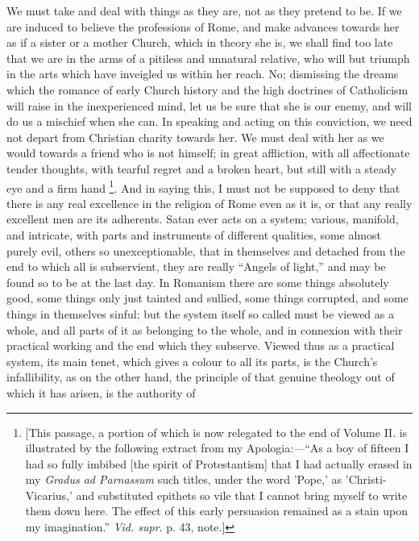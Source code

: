 We must take and deal with things as they are, not as they pretend
to be. If we are induced to believe the professions of Rome, and make
advances towards her as if a sister or a mother Church, which in
theory she is, we shall find too late that we are in the arms of a
pitiless and unnatural relative, who will but triumph in the arts
which have inveigled us within her reach. No; dismissing the dreams
which the romance of early Church history and the high doctrines
of Catholicism will raise in the inexperienced mind, let us be sure
that she is our enemy, and will do us a mischief when she can. In
speaking and acting on this conviction, we need not depart from
Christian charity towards her. We must deal with her as we would
towards a friend who is not himself; in great affliction, with all
affectionate tender thoughts, with tearful regret and a broken heart,
but still with a steady eye and a firm hand \footnote{[This passage, a portion of which is now
relegated to the end of Volume II. is illustrated by the following
extract from my Apologia:—``As a boy of fifteen I had so fully
imbibed [the spirit of Protestantism] that I had actually erased in my
\emph{Gradus ad Parnassum} such titles, under the word 'Pope,' as
'Christi-Vicarius,' and substituted epithets so vile that I cannot
bring myself to write them down here. The effect of this early
persuasion remained as a stain upon my imagination.'' \emph{Vid. supr}.
p. 43, note.]}. And in saying this, I must not be supposed to deny that there
is any real excellence in the religion of Rome even as it is, or that
any really excellent men are its adherents. Satan ever acts on a
system; various, manifold, and intricate, with parts and instruments
of different qualities, some almost purely evil, others so
unexceptionable, that in themselves and detached from the end to which
all is subservient, they are really ``Angels of light,'' and
may be found so to be at the last day. In Romanism there are some
things absolutely good, some things only just tainted and sullied,
some things corrupted, and some things in themselves sinful; but the
system itself so called must be viewed as a whole, and all parts of it
as belonging to the whole, and in connexion with their practical
working and the end which they subserve. Viewed thus as a practical
system, its main tenet, which gives a colour to all its parts, is the
Church's infallibility, as on the other hand, the principle of that
genuine theology out of which it has arisen, is the authority of
